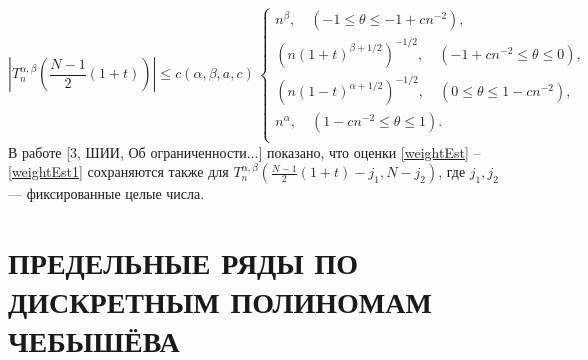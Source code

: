 \documentclass[12pt]{book}
\begin{document}
\begin{equation}\label{weightEst1}
  \left| T_{n}^{\alpha,\beta}\left(\frac{N-1}{2}(1+t)\right)\right| \leq
  c(\alpha,\beta,a,c)\,
  \left\{
    \begin{aligned}
    n^{\beta}, \quad (-1 \leq \theta \leq -1+cn^{-2}),\\
    \left(n(1+t)^{\beta+1/2}\right)^{-1/2}, \quad (-1+cn^{-2} \leq \theta \leq 0), \\
    \left(n(1-t)^{\alpha+1/2}\right)^{-1/2}, \quad (0 \leq \theta \leq 1-cn^{-2}), \\
    n^{\alpha}, \quad (1-cn^{-2} \leq \theta \leq 1).\\
    \end{aligned}
  \right.
\end{equation}
В работе [3, ШИИ, Об ограниченности...] показано, что оценки \eqref{weightEst} -- \eqref{weightEst1} сохраняются также для $T_{n}^{\alpha,\beta}\left(\frac{N-1}{2}(1+t)-j_1, N-j_2\right)$, где $j_1,j_2$ --- фиксированные целые числа.






\section*{ПРЕДЕЛЬНЫЕ РЯДЫ ПО ДИСКРЕТНЫМ ПОЛИНОМАМ ЧЕБЫШ\"ЕВА}
\end{document}

